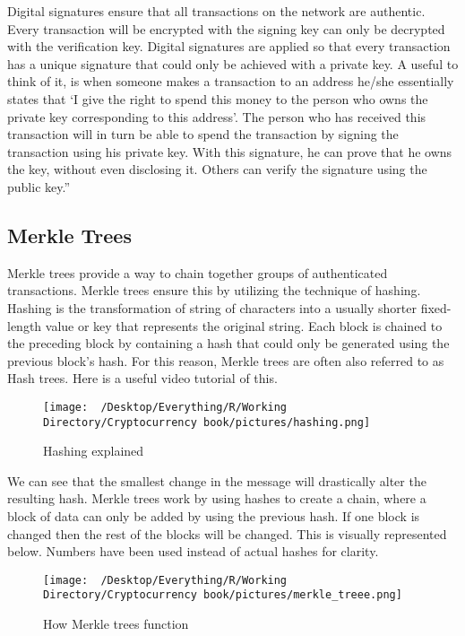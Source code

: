\documentclass[]{book}
\theoremstyle{definition}
\theoremstyle{definition}
\theoremstyle{definition}
\theoremstyle{remark}
\begin{document}
Digital signatures ensure that all transactions on the network are
authentic. Every transaction will be encrypted with the signing key can
only be decrypted with the verification key. Digital signatures are
applied so that every transaction has a unique signature that could only
be achieved with a private key. A useful to think of it, is when someone
makes a transaction to an address he/she essentially states that `I give
the right to spend this money to the person who owns the private key
corresponding to this address'. The person who has received this
transaction will in turn be able to spend the transaction by signing the
transaction using his private key. With this signature, he can prove
that he owns the key, without even disclosing it. Others can verify the
signature using the public key.''

\subsection{Merkle Trees}\label{merkle-trees}

Merkle trees provide a way to chain together groups of authenticated
transactions. Merkle trees ensure this by utilizing the technique of
hashing. Hashing is the transformation of string of characters into a
usually shorter fixed-length value or key that represents the original
string. Each block is chained to the preceding block by containing a
hash that could only be generated using the previous block's hash. For
this reason, Merkle trees are often also referred to as Hash trees. Here
is a useful video tutorial of this.

\begin{figure}[htbp]
\centering
\texttt{[image: ~/Desktop/Everything/R/Working Directory/Cryptocurrency book/pictures/hashing.png]}
\caption{Hashing explained}
\end{figure}

We can see that the smallest change in the message will drastically
alter the resulting hash. Merkle trees work by using hashes to create a
chain, where a block of data can only be added by using the previous
hash. If one block is changed then the rest of the blocks will be
changed. This is visually represented below. Numbers have been used
instead of actual hashes for clarity.

\begin{figure}[htbp]
\centering
\texttt{[image: ~/Desktop/Everything/R/Working Directory/Cryptocurrency book/pictures/merkle\_treee.png]}
\caption{How Merkle trees function}
\end{figure}
\end{document}
